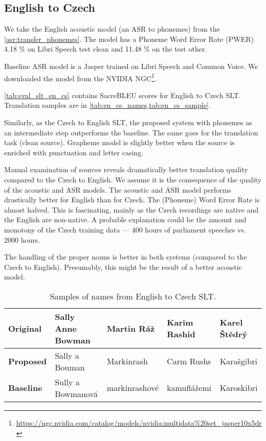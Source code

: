 \subsection{English to Czech}
We take the English acoustic model (an ASR to phonemes) from the \cref{asr:transfer_phonemes}. The model has a Phoneme Word Error Rate (PWER) 4.18 \% on Libri Speech test clean and 11.48 \% on the test other.

Baseline ASR model is a Jasper trained on Libri Speech and Common Voice. We downloaded the model from the NVIDIA NGC\footnote{\url{https://ngc.nvidia.com/catalog/models/nvidia:multidata\%20set_jasper10x5dr}}.

\cref{tab:eval_slt_en_cs} contains SacreBLEU scores for English to Czech SLT. Translation samples are in \cref{tab:en_cs_names,tab:en_cs_sample}.


Similarly, as the Czech to English SLT, the proposed system with phonemes as an intermediate step outperforms the baseline. The same goes for the translation task (clean source). Grapheme model is slightly better when the source is enriched with punctuation and letter casing. 

Manual examination of sources reveals dramatically better translation quality compared to the Czech to English. We assume it is the consequence of the quality of the acoustic and ASR models. The acoustic and ASR model performs drastically better for English than for Czech. The (Phoneme) Word Error Rate is almost halved. This is fascinating, mainly as the Czech recordings are native and the English are non-native. A probable explanation could be the amount and monotony of the Czech training data --- 400 hours of parliament speeches vs. 2000 hours. 

The handling of the proper nouns is better in both systems (compared to the Czech to English). Presumably, this might be the result of a better acoustic model.


\begin{table}[]
	\centering
	\small
	\begin{tabular}{l|llll}
		\textbf{Original} & Sally Anne Bowman & Martin Ráž  & Karim Rashid     & Karel Štědrý       \\ \hline
		\textbf{Proposed} & Sally a Bouman     & Markinrash & Carm Rushs      & Karašgibri  \\
		\textbf{Baseline} & Sully a Bowmanová    & markinrashové    & kamuflážemi & Karoskibri
	\end{tabular}
	\caption{Samples of names from English to Czech SLT.}
	\label{tab:en_cs_names}
\end{table}

